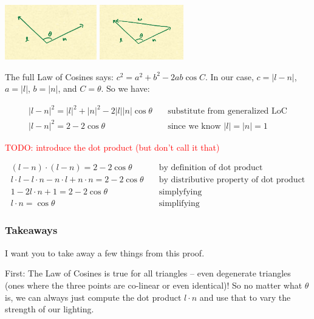 \documentclass{article}
\newcommand\todo[1]{\textcolor{red}{TODO: #1}}
\begin{document}
\begin{center}
	\includegraphics[width=0.3\textwidth,frame]{assets/ln.jpg}
	\hspace{0.2\textwidth}
	\includegraphics[width=0.2735\textwidth,frame]{assets/lnw.jpg}
\end{center}

The full Law of Cosines says: $c^2 = a^2 + b^2 - 2ab \cos C$.
In our case, $c = | l - n |$, $a = |l|$, $b = |n|$, and $C = \theta$.
So we have:

\begin{align*}
|l-n|^2 = |l|^2 + |n|^2 - 2 |l| |n| \cos \theta & \quad \text{substitute from generalized LoC} \\
|l-n|^2 = 2 - 2 \cos \theta & \quad \text{since we know } |l| = |n| = 1
\end{align*}

\todo{introduce the dot product (but don't call it that)}

\begin{align*}
(l - n) \cdot (l - n) = 2 - 2 \cos \theta & \quad \text{by definition of dot product} \\
l \cdot l - l \cdot n - n \cdot l + n \cdot n = 2 - 2 \cos \theta & \quad \text{by distributive property of dot product} \\
1 - 2 l \cdot n + 1 = 2 - 2 \cos \theta & \quad \text{simplyfying} \\
l \cdot n = \cos \theta & \quad \text{simplifying}
\end{align*}

\subsubsection{Takeaways}

I want you to take away a few things from this proof.

First: The Law of Cosines is true for all triangles -- even degenerate triangles (ones where the three points are co-linear or even identical)!
So no matter what $\theta$ is, we can always just compute the dot product $l \cdot n$ and use that to vary the strength of our lighting.
\end{document}
